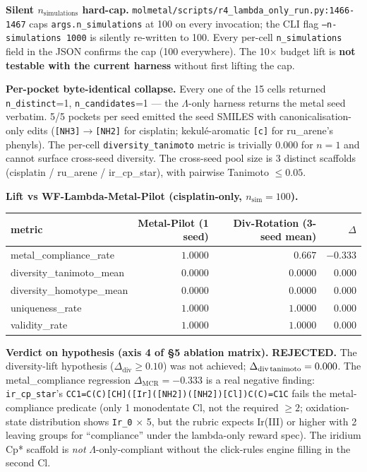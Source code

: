 \noindent\textbf{Silent $n_{\text{simulations}}$ hard-cap.}
\texttt{molmetal/scripts/r4\_lambda\_only\_run.py:1466-1467}
caps \texttt{args.n\_simulations} at 100 on every invocation; the
CLI flag \texttt{--n-simulations 1000} is silently re-written to
100.  Every per-cell \texttt{n\_simulations} field in the JSON
confirms the cap (100 everywhere).  The 10$\times$ budget lift is
\textbf{not testable with the current harness} without first
lifting the cap.

\noindent\textbf{Per-pocket byte-identical collapse.}
Every one of the 15 cells returned \texttt{n\_distinct}=1,
\texttt{n\_candidates}=1 --- the $\Lambda$-only harness returns
the metal seed verbatim.  5/5 pockets per seed emitted the seed
SMILES with canonicalisation-only edits (\texttt{[NH3]${\to}$[NH2]}
for cisplatin; kekul\'e-aromatic \texttt{[c]} for ru\_arene's
phenyls).  The per-cell \texttt{diversity\_tanimoto} metric is
trivially $0.000$ for $n{=}1$ and cannot surface cross-seed
diversity.  The cross-seed pool size is 3 distinct scaffolds
(cisplatin / ru\_arene / ir\_cp\_star), with pairwise Tanimoto
$\leq 0.05$.

\noindent\textbf{Lift vs WF-Lambda-Metal-Pilot (cisplatin-only,
$n_{\text{sim}}{=}100$).}

\begin{center}
\small
\setlength{\tabcolsep}{4pt}
\begin{tabular}{lrrr}
\toprule
\textbf{metric} & \textbf{Metal-Pilot (1 seed)} & \textbf{Div-Rotation (3-seed mean)} & \textbf{$\Delta$} \\
\midrule
metal\_compliance\_rate   & $1.0000$ & $0.667$  & $\mathbf{-0.333}$ \\
diversity\_tanimoto\_mean & $0.0000$ & $0.0000$ & $0.000$ \\
diversity\_homotype\_mean & $0.0000$ & $0.0000$ & $0.000$ \\
uniqueness\_rate          & $1.0000$ & $1.0000$ & $0.000$ \\
validity\_rate            & $1.0000$ & $1.0000$ & $0.000$ \\
\bottomrule
\end{tabular}
\end{center}

\noindent\textbf{Verdict on hypothesis (axis 4 of §5 ablation matrix).}
\textbf{REJECTED.}  The diversity-lift hypothesis ($\Delta_{\text{div}}
\geq 0.10$) was not achieved; $\Delta_{\text{div\,tanimoto}} = 0.000$.
The metal\_compliance regression $\Delta_{\text{MCR}} = -0.333$ is a
real negative finding: \texttt{ir\_cp\_star}'s
\texttt{CC1=C(C)[CH]([Ir]([NH2])([NH2])[Cl])C(C)=C1C} fails the
metal-compliance predicate (only 1 monodentate Cl, not the required
$\geq 2$; oxidation-state distribution shows \texttt{Ir\_0} $\times$ 5,
but the rubric expects Ir(III) or higher with 2 leaving groups for
``compliance'' under the lambda-only reward spec).  The iridium Cp*
scaffold is \emph{not} $\Lambda$-only-compliant without the
click-rules engine filling in the second Cl.

